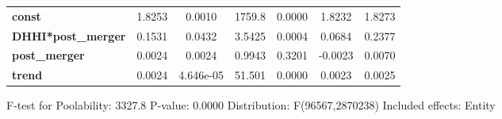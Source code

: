 \documentclass{report}
\begin{document}
\begin{center}
\begin{tabular}{lcccccc}
\midrule
\textbf{const}             &       1.8253       &       0.0010       &      1759.8     &      0.0000      &       1.8232      &       1.8273       \\
\textbf{DHHI*post\_merger} &       0.1531       &       0.0432       &      3.5425     &      0.0004      &       0.0684      &       0.2377       \\
\textbf{post\_merger}      &       0.0024       &       0.0024       &      0.9943     &      0.3201      &      -0.0023      &       0.0070       \\
\textbf{trend}             &       0.0024       &     4.646e-05      &      51.501     &      0.0000      &       0.0023      &       0.0025       \\
\bottomrule
\end{tabular}
\end{center}

F-test for Poolability: 3327.8 \newline
 P-value: 0.0000 \newline
 Distribution: F(96567,2870238) \newline
  \newline
 Included effects: Entity
\end{document}
